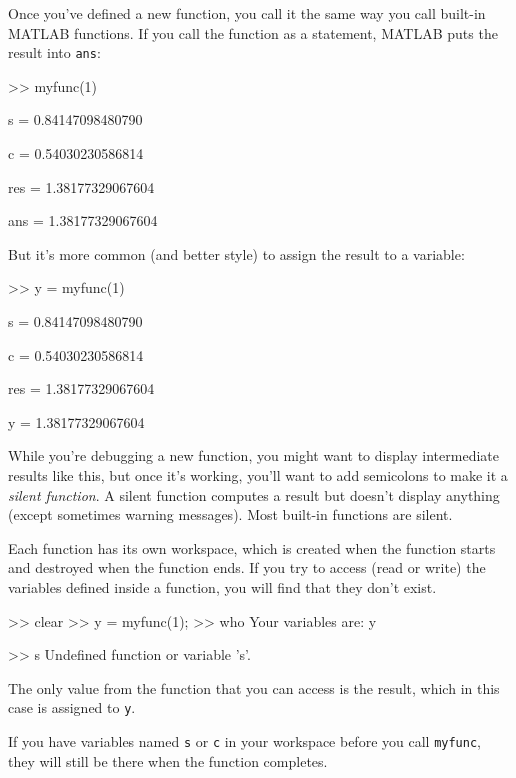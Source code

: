 
Once you've defined a new function, you call it the same way you
call built-in MATLAB functions.  If you call the function as a statement,
MATLAB puts the result into \lstinline{ans}:

\begin{code}
>> myfunc(1)

s = 0.84147098480790

c = 0.54030230586814

res = 1.38177329067604

ans = 1.38177329067604
\end{code}

But it's more common (and better style) to assign the result to
a variable:

\begin{code}
>> y = myfunc(1)

s = 0.84147098480790

c = 0.54030230586814

res = 1.38177329067604

y = 1.38177329067604
\end{code}

While you're debugging a new function, you might want to display
intermediate results like this, but once it's working, you'll want
to add semicolons to make it a \emph{silent function}.  A silent function
computes a result but doesn't display
anything (except sometimes warning messages). Most built-in
functions are silent.


Each function has its own workspace, which is created when the
function starts and destroyed when the function ends.  If you try to
access (read or write) the variables defined inside a function, you
will find that they don't exist.

\begin{code}
>> clear
>> y = myfunc(1);
>> who
Your variables are: y

>> s
Undefined function or variable 's'.
\end{code}

The only value from the function that you can access is the result,
which in this case is assigned to \lstinline{y}.

If you have variables named \lstinline{s} or \lstinline{c} in your workspace
before you call \lstinline{myfunc}, they will still be there when the
function completes.


